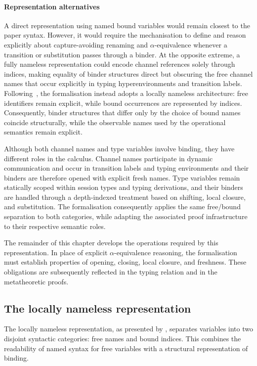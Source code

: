 \paragraph{Representation alternatives} A direct representation using named bound variables would remain closest to the paper syntax. However, it would require the mechanisation to define and reason explicitly about capture-avoiding renaming and $\alpha$-equivalence whenever a transition or substitution passes through a binder. At the opposite extreme, a fully nameless representation could encode channel references solely through indices, making equality of binder structures direct but obscuring the free channel names that occur explicitly in typing hyperenvironments and transition labels. Following~\citet{C12}, the formalisation instead adopts a locally nameless architecture: free identifiers remain explicit, while bound occurrences are represented by indices. Consequently, binder structures that differ only by the choice of bound names coincide structurally, while the observable names used by the operational semantics remain explicit.

Although both channel names and type variables involve binding, they have different roles in the calculus. Channel names participate in dynamic communication and occur in transition labels and typing environments and their binders are therefore opened with explicit fresh names. Type variables remain statically scoped within session types and typing derivations, and their binders are handled through a depth-indexed treatment based on shifting, local closure, and substitution. The formalisation consequently applies the same free/bound separation to both categories, while adapting the associated proof infrastructure to their respective semantic roles.

The remainder of this chapter develops the operations required by this representation. In place of explicit $\alpha$-equivalence reasoning, the formalisation must establish properties of opening, closing, local closure, and freshness. These obligations are subsequently reflected in the typing relation and in the metatheoretic proofs.

\subsection{The locally nameless representation}\label{subsec:locally-nameless} %
The locally nameless representation, as presented by \citet{C12}, separates variables into two disjoint syntactic categories: free names and bound indices. This combines the readability of named syntax for free variables with a structural representation of binding.

